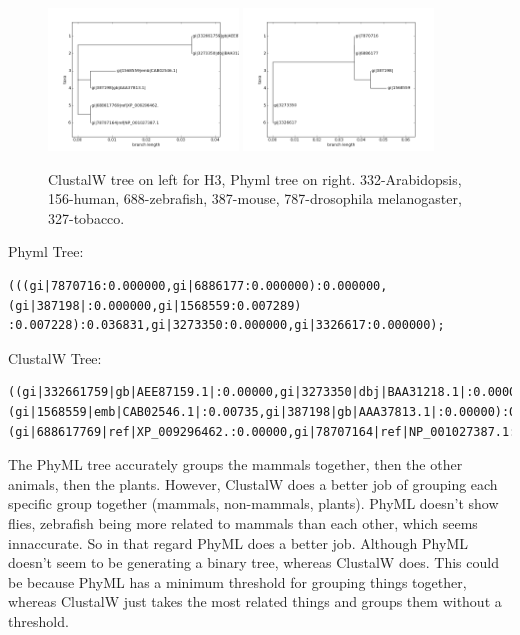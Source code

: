 \documentclass[10pt]{article} %
\begin{document}
\begin{figure}[h!]
  \centering
  \includegraphics[width=0.45\textwidth]{h3-clustalw.png}
  \includegraphics[width=0.45\textwidth]{h3-phyml.png}
  \caption{ClustalW tree on left for H3, Phyml tree on right. 332-Arabidopsis, 156-human, 688-zebrafish,
  387-mouse, 787-drosophila melanogaster, 327-tobacco.}
\end{figure}

Phyml Tree:
\begin{verbatim}
(((gi|7870716:0.000000,gi|6886177:0.000000):0.000000,(gi|387198|:0.000000,gi|1568559:0.007289)
:0.007228):0.036831,gi|3273350:0.000000,gi|3326617:0.000000);
\end{verbatim}

ClustalW Tree:
\begin{verbatim}
((gi|332661759|gb|AEE87159.1|:0.00000,gi|3273350|dbj|BAA31218.1|:0.00000):0.03309,
(gi|1568559|emb|CAB02546.1|:0.00735,gi|387198|gb|AAA37813.1|:0.00000):0.00368,
(gi|688617769|ref|XP_009296462.:0.00000,gi|78707164|ref|NP_001027387.1:0.00000):0.00368);
\end{verbatim}

The PhyML tree accurately groups the mammals together, then the other animals, then the plants.
However, ClustalW does a better job of grouping each specific group together (mammals, non-mammals,
plants). PhyML doesn't show flies, zebrafish being more related to mammals than each other,
which seems innaccurate. So in that regard PhyML does a better job. Although PhyML doesn't seem
to be generating a binary tree, whereas ClustalW does. This could be because PhyML has a minimum
threshold for grouping things together, whereas ClustalW just takes the most related things and
groups them without a threshold.\\
\end{document}
